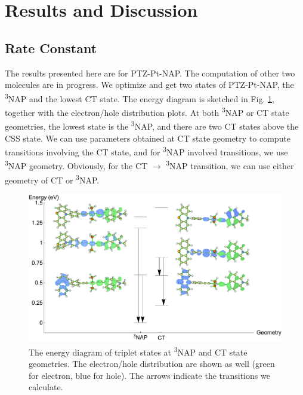


\section{Results and Discussion} %

\subsection{Rate Constant}
The results presented here are for PTZ-Pt-NAP. The computation of other two molecules are in progress. We optimize and get two states of PTZ-Pt-NAP, the \textsuperscript{3}NAP and the lowest CT state. The energy diagram is sketched in Fig. \ref{ene_diagram}, together with the electron/hole distribution plots. At both \textsuperscript{3}NAP or CT state geometries, the lowest state is the \textsuperscript{3}NAP, and there are two CT states above the CSS state. We can use parameters obtained at CT state geometry to compute transitions involving the CT state, and  for \textsuperscript{3}NAP involved transitions, we use  \textsuperscript{3}NAP geometry. Obviously, for the CT $\rightarrow$ \textsuperscript{3}NAP transition, we can use either geometry of CT or \textsuperscript{3}NAP.


\begin{figure}[]
\includegraphics[width=\columnwidth]{Chapters/chap4/Images/energy_diagram.pdf}
\caption{The energy diagram of triplet states at \textsuperscript{3}NAP and CT state geometries. The electron/hole distribution are shown as well (green for electron, blue for hole). The arrows indicate the transitions we calculate.
}\label{ene_diagram}
\end{figure}


